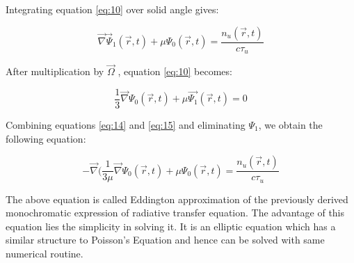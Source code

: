 \documentclass{article}
\begin{document}
Integrating equation \ref{eq:10} over solid angle gives:

\begin{equation} \label{eq:14}
\vec{\nabla} \vec{\Psi}_1(\vec{r},t) + \mu\Psi_0(\vec{r},t) = \frac{n_u (\vec{r},t)}{c \tau_{u}}
\end{equation}

After multiplication by $\vec{\Omega}$ , equation \ref{eq:10} becomes:

\begin{equation} \label{eq:15}
\frac{1}{3}\vec{\nabla}\Psi_0(\vec{r},t) + \mu \vec{\Psi_1}(\vec{r},t) = 0
\end{equation} 

Combining equations \ref{eq:14} and \ref{eq:15} and eliminating $\Psi_1$, we obtain the following equation:

\begin{equation} \label{eq:16}
-\vec{\nabla}(\frac{1}{3\mu} \vec{\nabla}\Psi_0(\vec{r},t) + \mu \Psi_0(\vec{r},t) = \frac{n_u (\vec{r},t)}{c \tau_{u}}
\end{equation} 

The above equation is called Eddington approximation of the previously derived monochromatic expression of radiative transfer equation. The advantage of this equation lies the simplicity in solving it. It is an elliptic equation which has a similar structure to Poisson's Equation and hence can be solved with same numerical routine. 





\printbibliography
%
\end{document}
